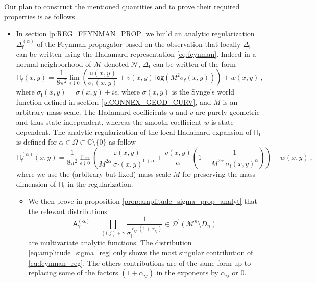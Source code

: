 \documentclass[11pt]{book}
\newcommand{\alphabd}{\boldsymbol{\alpha}}
\renewcommand{\log}{\mathsf{log}}
\newcommand{\Dcal}{\mathcal{D}}
\newcommand{\Mcal}{\mathcal{M}}
\newcommand{\Ncal}{\mathcal{N}}
\newcommand{\Cbb}{\mathbb{C}}
\newcommand{\Asf}{\mathsf{A}}
\newcommand{\Hsf}{\mathsf{H}}
\newcommand{\fsf}{\mathsf{f}}
\newcommand{\usf}{\mathsf{u}}
\theoremstyle{break}
\begin{document}
\bigskip


Our plan to construct the mentioned quantities and to prove their required properties is as follows.


\begin{itemize}


\item In section \ref{p:REG_FEYNMAN_PROP} we build an analytic regularization $\Delta^{(\alpha)}_\fsf$ of the Feynman propagator based on the observation that locally $\Delta_\fsf$ can be written using the Hadamard representation \eqref{eq:feynman}. Indeed in a normal neighborhood of $\Mcal$ denoted $\Ncal$, $\Delta_\fsf$ can be written of the form
%
\begin{equation}
\Hsf_\fsf(x,y) = \frac{1}{8\pi^2}  \lim_{\epsilon \downarrow 0} \left( \frac{\usf(x,y)}{\sigma_\fsf(x,y)} + v(x,y) \ \log\left( M^2 \sigma_\fsf(x,y)\right) \right) + w(x,y) \ ,
\label{eq:feynman} 
\end{equation}
%
where $\sigma_\fsf(x,y) = \sigma(x,y) + i \epsilon$, where $\sigma(x,y)$ is the Synge's world function defined in section \ref{p:CONNEX_GEOD_CURV}, and $M$ is an arbitrary mass scale. The Hadamard coefficients $u$ and $v$ are purely geometric and thus state independent, whereas the smooth coefficient $w$ is state dependent. The analytic regularization of the local Hadamard expansion of $\Hsf_\fsf$ is defined for $\alpha \in \Omega \subset \Cbb \setminus \{0\}$ as follow 
%
\begin{equation}
\Hsf^{(\alpha)}_\fsf(x,y) = \frac{1}{8\pi^2} \lim_{\epsilon \downarrow 0} \left( \frac{\usf(x,y)}{M^{2\alpha} \ \sigma_\fsf(x,y)^{1+\alpha}} + \frac{v(x,y)}{\alpha} \left( 1 - \frac{1}{ M^{2\alpha} \ \sigma_\fsf(x,y)^{\alpha} } \right) \right) + w(x,y) \ ,
\label{eq:feynman_reg}
\end{equation}
%
where we use the (arbitrary but fixed) mass scale $M$ for preserving the mass dimension of $\Hsf_\fsf$ in the regularization. 


\begin{itemize}


\item We then prove in proposition \ref{prop:amplitude_sigma_prop_analyt} that the relevant distributions 
%
\begin{equation*}
\Asf_\gamma^{(\alphabd)} = \prod_{(i,j)\in\gamma} \frac{1}{\sigma_\fsf^{\ell_{ij}(1+\alpha_{ij})}} \in \Dcal^\prime(\Mcal^n\setminus D_n)
\end{equation*}
\index{$\Asf_\gamma^{(\alphabd)}$}%
%
are multivariate analytic functions. The distribution \eqref{eq:amplitude_sigma_reg} only shows the most singular contribution of \eqref{eq:feynman_reg}. The others contributions are of the same form up to replacing some of the factors $(1+\alpha_{ij})$ in the exponents by $\alpha_{ij}$ or $0$.



\end{itemize}
\end{itemize}
\end{document}
